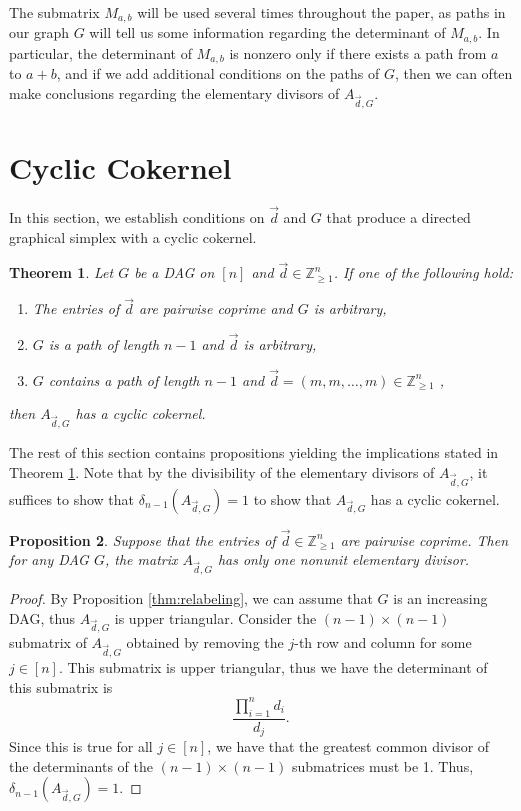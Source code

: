 \documentclass[12pt]{amsart}
\newtheorem{thm}{Theorem}[section]
\newtheorem{prop}[thm]{Proposition}
\theoremstyle{definition}
\numberwithin{equation}{section}
\newcommand{\ring}[1]{\ensuremath{\mathbb{#1}}}
\renewcommand\>{\rangle}
\newcommand\<{\langle}
\newcommand\0{\mathbf{0}}
\newcommand\ZZ{\ring{Z}}
\begin{document}
The submatrix $M_{a,b}$ will be used several times throughout the paper, as paths in our graph $G$ will tell us some information regarding the determinant of $M_{a,b}$. In particular,  the determinant of $M_{a,b}$ is nonzero only if there exists a path from $a$ to $a+b$, and if we add additional conditions on the paths of $G$, then we can often make conclusions regarding the elementary divisors of $A_{\vec{d}, G}$. 

\section{Cyclic Cokernel}
\label{sec:cyclic_cokernel}

In this section, we establish conditions on $\vec{d}$ and $G$ that produce a directed graphical simplex with a cyclic cokernel.  

\begin{thm}\label{thm:cyclic_cokernel}
	Let $G$ be a DAG on $[n]$ and $\vec{d} \in \ZZ^n_{\geq 1}$. If one of the following hold:
	\begin{enumerate}
		\item The entries of $\vec{d}$ are pairwise coprime and $G$ is arbitrary,
		\item $G$ is a path of length $n-1$ and $\vec{d}$ is arbitrary,
		\item $G$ contains a path of length $n-1$ and $\vec{d} = (m,m,\dots,m) \in \ZZ_{\geq 1}^n$ ,
	\end{enumerate}
	then $A_{\vec{d}, G}$ has a cyclic cokernel.
\end{thm}

The rest of this section contains propositions yielding the implications stated in Theorem \ref{thm:cyclic_cokernel}. 
Note that by the divisibility of the elementary divisors of $A_{\vec{d}, G}$, it suffices to show that $\delta_{n-1}(A_{\vec{d}, G}) = 1$ to show that $A_{\vec{d}, G}$ has a cyclic cokernel.

\begin{prop}\label{thm:pairwise_coprime}
	Suppose that the entries of $\vec{d} \in \ZZ_{\geq 1}^n$ are pairwise coprime. 
	Then for any DAG $G$, the matrix $A_{\vec{d}, G}$ has only one nonunit elementary divisor.
\end{prop}
\begin{proof}
	By Proposition \ref{thm:relabeling}, we can assume that $G$ is an increasing DAG, thus $A_{\vec{d}, G}$ is upper triangular.
	Consider the $(n-1) \times (n-1)$ submatrix of $A_{\vec{d}, G}$ obtained by removing the $j$-th row and column for some $j \in [n]$. This submatrix is upper triangular, thus we have the determinant of this submatrix is
	\[\frac{\prod_{i=1}^n d_i}{d_j}.\]
	Since this is true for all $j \in [n]$, we have that the greatest common divisor of the determinants of the $(n-1) \times (n-1)$ submatrices must be 1. 
	Thus, $\delta_{n-1}(A_{\vec{d}, G}) = 1$.
\end{proof}
\end{document}
